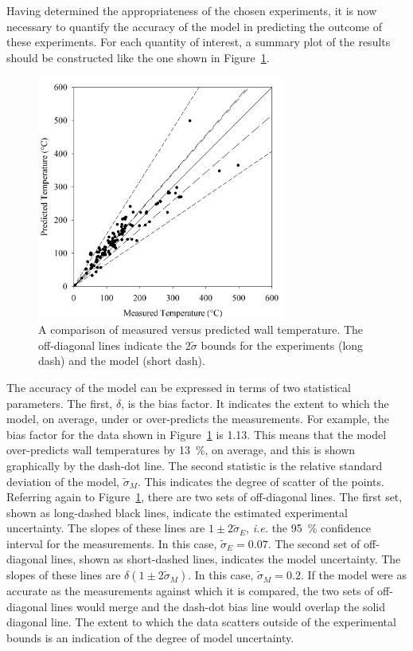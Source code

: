 \documentclass[graybox]{svmult}
\begin{document}
Having determined the appropriateness of the chosen experiments, it is now necessary to quantify the accuracy of the model in predicting the outcome of these experiments. For each quantity of interest, a summary plot of the results should be constructed like the one shown in Figure~\ref{scatterplot}.
\begin{figure}[ht]
\includegraphics[width=3.2in]{Fig_scatter_plot}
\caption{A comparison of measured versus predicted wall temperature. The off-diagonal lines indicate the $2 \widetilde{\sigma}$ bounds for the experiments (long dash) and the model (short dash).}
\label{scatterplot}
\end{figure}
The accuracy of the model can be expressed in terms of two statistical parameters. The first, $\delta$, is the bias factor. It indicates the extent to which the model, on average, under or over-predicts the measurements. For example, the bias factor for the data shown in Figure~\ref{scatterplot} is 1.13. This means that the model over-predicts wall temperatures by 13~\%, on average, and this is shown graphically by the dash-dot line. The second statistic is the relative standard deviation of the model, $\widetilde{\sigma}_M$. This indicates the degree of scatter of the points. Referring again to Figure~\ref{scatterplot}, there are two sets of off-diagonal lines. The first set, shown as long-dashed black lines, indicate the estimated experimental uncertainty. The slopes of these lines are $1\pm 2 \widetilde{\sigma}_E$, {\em i.e.} the 95~\% confidence interval for the measurements. In this case, $\widetilde{\sigma}_E=0.07$. The second set of off-diagonal lines, shown as short-dashed lines, indicates the model uncertainty. The slopes of these lines are $\delta (1\pm 2 \widetilde{\sigma}_M)$. In this case, $\widetilde{\sigma}_M=0.2$. If the model were as accurate as the measurements against which it is compared, the two sets of off-diagonal lines would merge and the dash-dot bias line would overlap the solid diagonal line. The extent to which the data scatters outside of the experimental bounds is an indication of the degree of model uncertainty.
\end{document}
